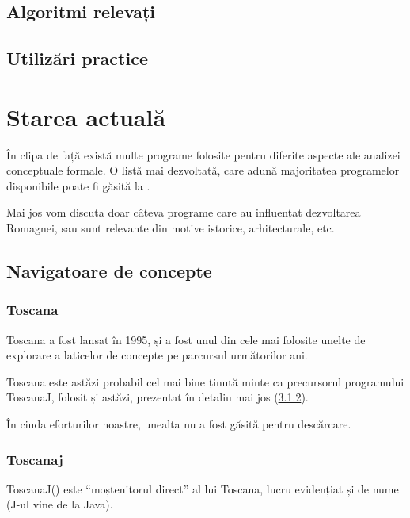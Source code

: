 \documentclass[12pt, a4paper, twoside, romanian]{teza-upb}
\begin{document}
  \section{Algoritmi relevați}

  \section{Utilizări practice}
  \label{sec:utilizari-practice}

\chapter{Starea actuală}
\label{chapter:2}

  În clipa de față există multe programe folosite pentru diferite aspecte ale analizei conceptuale formale. O listă mai dezvoltată, care adună majoritatea programelor disponibile poate fi găsită la \cite{utapriss:software}.

  Mai jos vom discuta doar câteva programe care au influențat dezvoltarea Romagnei, sau sunt relevante din motive istorice, arhitecturale, etc.
  \section{Navigatoare de concepte}
    \subsection{Toscana}
      Toscana\cite{Vogt:1995:Toscana} a fost lansat în 1995, și a fost unul din cele mai folosite unelte de explorare a laticelor de concepte pe parcursul următorilor ani.

      Toscana este astăzi probabil cel mai bine ținută minte ca precursorul programului ToscanaJ, folosit și astăzi, prezentat în detaliu mai jos (\ref{subsec:toscanaj}).

      În ciuda eforturilor noastre, unealta nu a fost găsită pentru descărcare.

    \subsection{Toscanaj}
    \label{subsec:toscanaj}
      ToscanaJ(\cite{Toscanaj:homepage}) este ``moștenitorul direct'' al lui Toscana, lucru evidențiat și de nume (J-ul vine de la Java).
\end{document}
